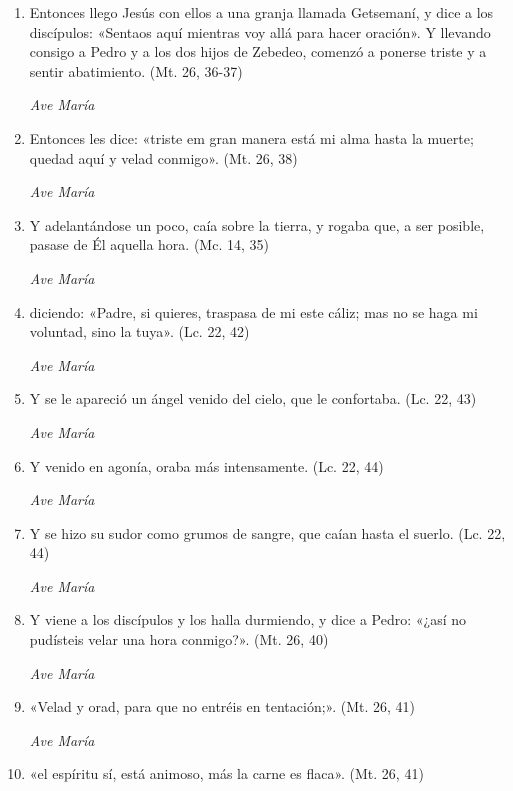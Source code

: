 \documentclass[a4paper,11pt, oneside]{report}
\begin{document}
        \begin{enumerate}

          \item Entonces llego Jesús con ellos a una granja llamada Getsemaní, y dice a los discípulos: «Sentaos aquí mientras voy allá para hacer oración». 
          Y llevando consigo a Pedro y a los dos hijos de Zebedeo, comenzó a ponerse triste y a sentir abatimiento. (Mt. 26, 36-37)

          \textit{Ave María}

          \item Entonces les dice: «triste em gran manera está mi alma hasta la muerte; quedad aquí y velad conmigo». (Mt. 26, 38)

          \textit{Ave María}

          \item Y adelantándose un poco, caía sobre la tierra, y rogaba que, a ser posible, pasase de Él aquella hora. (Mc. 14, 35)

          \textit{Ave María}

          \item diciendo: «Padre, si quieres, traspasa de mi este cáliz; mas no se haga mi voluntad, sino la tuya». (Lc. 22, 42)

          \textit{Ave María}

          \item Y se le apareció un ángel venido del cielo, que le confortaba. (Lc. 22, 43)

          \textit{Ave María}

          \item Y venido en agonía, oraba más intensamente. (Lc. 22, 44)

          \textit{Ave María}

          \item Y se hizo su sudor como grumos de sangre, que caían hasta el suerlo. (Lc. 22, 44)

          \textit{Ave María}

          \item Y viene a los discípulos y los halla durmiendo, y dice a Pedro: «¿así no pudísteis velar una hora conmigo?». (Mt. 26, 40)

          \textit{Ave María}

          \item «Velad y orad, para que no entréis en tentación;». (Mt. 26, 41)

          \textit{Ave María}

          \item «el espíritu sí, está animoso, más la carne es flaca». (Mt. 26, 41)

        \end{enumerate}
\end{document}
